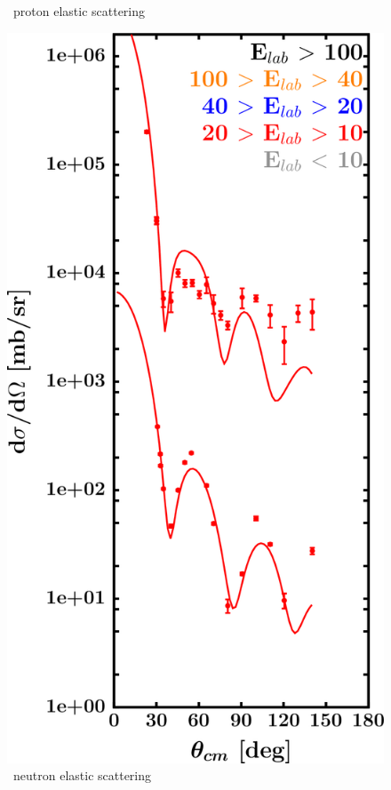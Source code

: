 \begin{figure}[hbtp]
\begin{minipage}{0.47\textwidth}
        \caption*{\snTwelve\ proton elastic scattering}
        \label{DOMFitData_sn112_proton_elastic}
    \end{minipage}\hspace{6pt}
    \begin{minipage}{0.47\textwidth}
        \centering
        \includegraphics[width=\textwidth]{figures/sn112_neutronElastic.png}
        \caption*{\snTwelve\ neutron elastic scattering}
        \label{DOMFitData_sn112_neutron_elastic}
    \end{minipage}
\end{figure}
